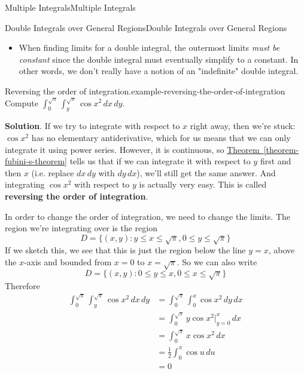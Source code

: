 \documentclass[10pt,]{book}
\newcommand{\terminology}[1]{\textbf{#1}}
\numberwithin{equation}{section}
\begin{document}
\begin{chapterptx}{Multiple Integrals}{}{Multiple Integrals}{}{}
\begin{sectionptx}{Double Integrals over General Regions}{}{Double Integrals over General Regions}{}{}
\begin{itemize}[label=\textbullet]
\item{}When finding limits for a double integral, the outermost limits \emph{must be constant} since the double integral must eventually simplify to a constant. In other words, we don't really have a notion of an "indefinite" double integral.%
\end{itemize}
%
\begin{example}{Reversing the order of integration.}{example-reversing-the-order-of-integration}%
\hypertarget{p-1259}{}%
Compute \(\int_{0}^{\sqrt{\pi}}\int_{y}^{\sqrt{\pi}}\cos x^{2}\,dx\,dy\).%
\par\smallskip%
\noindent\textbf{Solution}.\hypertarget{solution-200}{}\quad%
\hypertarget{p-1260}{}%
If we try to integrate with respect to \(x\) right away, then we're stuck: \(\cos x^{2}\) has no elementary antiderivative, which for us means that we can only integrate it using power series. However, it is continuous, so \hyperref[theorem-fubini-s-theorem]{Theorem~\ref{theorem-fubini-s-theorem}} tells us that if we can integrate it with respect to \(y\) first and then \(x\) (i.e. replace \(dx\,dy\) with \(dy\,dx\)), we'll still get the same answer. And integrating \(\cos x^{2}\) with respect to \(y\) is actually very easy. This is called \terminology{reversing the order of integration}.%
\par
\hypertarget{p-1261}{}%
In order to change the order of integration, we need to change the limits. The region we're integrating over is the region%
\begin{equation*}
D = \{(x,y) : y\leq x\leq \sqrt{\pi}, 0\leq y\leq\sqrt{\pi}\}
\end{equation*}
If we sketch this, we see that this is just the region below the line \(y = x\), above the \(x\)-axis and bounded from \(x=0\) to \(x=\sqrt{\pi}\). So we can also write%
\begin{equation*}
D = \{(x,y) : 0\leq y\leq x, 0\leq x\leq\sqrt{\pi}\}
\end{equation*}
Therefore%
\begin{align*}
\int_{0}^{\sqrt{\pi}}\int_{y}^{\sqrt{\pi}}\cos x^{2}\,dx\,dy & = \int_{0}^{\sqrt{\pi}}\int_{0}^{x}\cos x^{2}\,dy\,dx \\
& = \int_{0}^{\sqrt{\pi}}y\cos x^{2}\bigg|_{y=0}^{x}\,dx \\
& = \int_{0}^{\sqrt{\pi}}x\cos x^{2}\,dx \\
& = \frac{1}{2}\int_{0}^{\pi}\cos u\,du \\
& = 0 
\end{align*}
%
\end{example}

\end{sectionptx}
\end{chapterptx}
\end{document}
